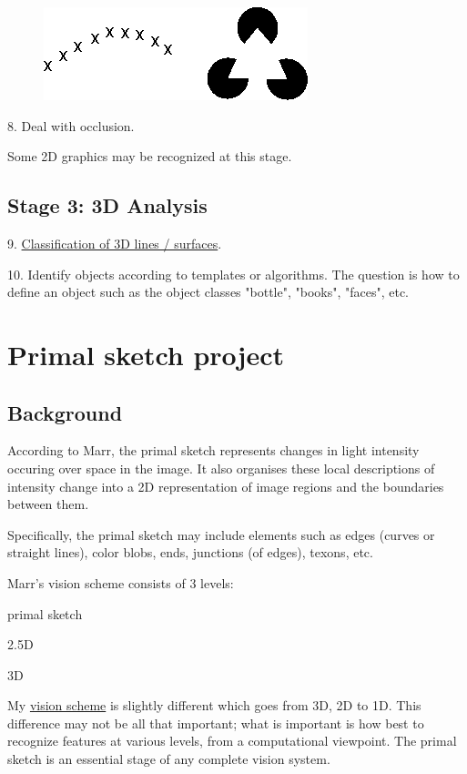 \begin{figure}[H]
\centering
\includegraphics[scale=0.6]{GestaltContours.PNG}
\end{figure}

8. Deal with occlusion.

Some 2D graphics may be recognized at this stage.

\subsection{Stage 3: 3D Analysis}

9. \href{Vis-3DTaxonomy.htm}{Classification of 3D lines / surfaces}.

10. Identify objects according to templates or algorithms. The question is how to define an object such as the object classes "bottle", "books", "faces", etc.

\section{Primal sketch project}

\subsection{Background}

According to Marr, the primal sketch represents changes in light intensity occuring over space in the image. It also organises these local descriptions of intensity change into a 2D representation of image regions and the boundaries between them.

Specifically, the primal sketch may include elements such as edges (curves or straight lines), color blobs, ends, junctions (of edges), texons, etc.

Marr's vision scheme consists of 3 levels:
\begin{compactenum-}
	\item primal sketch
	\item 2.5D
	\item 3D
\end{compactenum-}

My \href{Vis-BasicScheme.htm}{vision scheme} is slightly different which goes from 3D, 2D to 1D. This difference may not be all that important; what is important is how best to recognize features at various levels, from a computational viewpoint. The primal sketch is an essential stage of any complete vision system.

